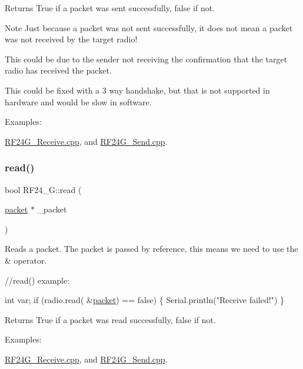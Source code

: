 \begin{DoxyReturn}{Returns}
True if a packet was sent successfully, false if not. 
\end{DoxyReturn}
\begin{DoxyNote}{Note}
Just because a packet was not sent successfully, it does not mean a packet was not received by the target radio! 

This could be due to the sender not receiving the confirmation that the target radio has received the packet. 

This could be fixed with a 3 way handshake, but that is not supported in hardware and would be slow in software. 
\end{DoxyNote}
\begin{Desc}
\item[Examples\+: ]\par
\hyperlink{_r_f24_g__receive_8cpp-example}{R\+F24\+G\+\_\+\+Receive.\+cpp}, and \hyperlink{_r_f24_g__send_8cpp-example}{R\+F24\+G\+\_\+\+Send.\+cpp}.\end{Desc}
\hypertarget{class_r_f24___g_a00d022e73f823087f1b2185545afbaa4}{}\label{class_r_f24___g_a00d022e73f823087f1b2185545afbaa4} 
\subsubsection{\texorpdfstring{read()}{read()}}
{\footnotesize\ttfamily bool R\+F24\+\_\+\+G\+::read (\begin{DoxyParamCaption}\item[{\hyperlink{classpacket}{packet} $\ast$}]{\+\_\+packet }\end{DoxyParamCaption})}

Reads a packet. The packet is passed by reference, this means we need to use the \& operator.


\begin{DoxyCode}
\textcolor{comment}{//read() example:}

     \textcolor{keywordtype}{int} var;
     \textcolor{keywordflow}{if} (radio.read( &\hyperlink{classpacket}{packet}) == \textcolor{keyword}{false}) \{
         Serial.println(\textcolor{stringliteral}{"Receive failed!"})
     \}
\end{DoxyCode}


\begin{DoxyReturn}{Returns}
True if a packet was read successfully, false if not. 
\end{DoxyReturn}
\begin{Desc}
\item[Examples\+: ]\par
\hyperlink{_r_f24_g__receive_8cpp-example}{R\+F24\+G\+\_\+\+Receive.\+cpp}, and \hyperlink{_r_f24_g__send_8cpp-example}{R\+F24\+G\+\_\+\+Send.\+cpp}.\end{Desc}
\hypertarget{class_r_f24___g_a84472b6c06d38d0e04d783056d1b2698}{}\label{class_r_f24___g_a84472b6c06d38d0e04d783056d1b2698} 
